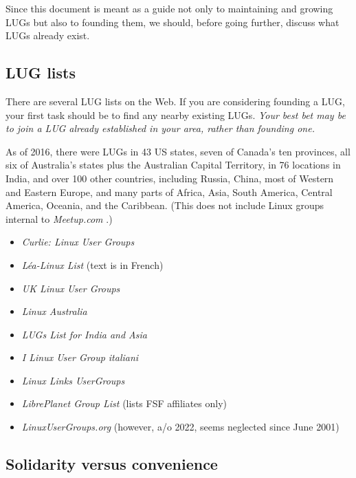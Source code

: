 \documentclass{HOWTO}
\begin{document}
Since this document is meant as a guide not only to maintaining and
growing LUGs but also to founding them, we should, before going further,
discuss what LUGs already exist.




\subsection{LUG lists}

There are several LUG lists on the Web. If you are considering founding a
LUG, your first task should be to find any nearby existing LUGs.
{\itshape Your best bet may be to join a LUG already established in your area,
rather than founding one.\/}

As of 2016, there were LUGs in 43 US states, seven of Canada's ten provinces, 
all six of Australia's states plus the Australian Capital Territory, in 76 
locations in India, and over 100 other countries, including Russia, China, most 
of Western and Eastern Europe, and many parts of Africa, Asia, South America, 
Central America, Oceania, and the Caribbean.  (This does not include Linux 
groups internal to 
\emph{Meetup.com} \texttt{\abyurl}
.)

\begin{itemize}
\item 
\emph{Curlie: Linux User Groups} \texttt{\abzurl}
\item 
\emph{L\'ea-Linux List} \texttt{\acaurl}
  (text is in French)
\item 
\emph{UK Linux User Groups} \texttt{\acburl}
\item 
\emph{Linux Australia} \texttt{\accurl}
\item 
\emph{LUGs List for India and Asia} \texttt{\acdurl}
\item 
\emph{I Linux User Group italiani} \texttt{\aceurl}
\item 
\emph{Linux Links UserGroups} \texttt{\acfurl}
\item 
\emph{LibrePlanet Group List} \texttt{\acgurl}
 (lists FSF affiliates only)
\item 
\emph{LinuxUserGroups.org} \texttt{\achurl}
 (however, a/o 2022, seems neglected since June 2001)
\end{itemize}





\subsection{Solidarity versus convenience}
\end{document}
